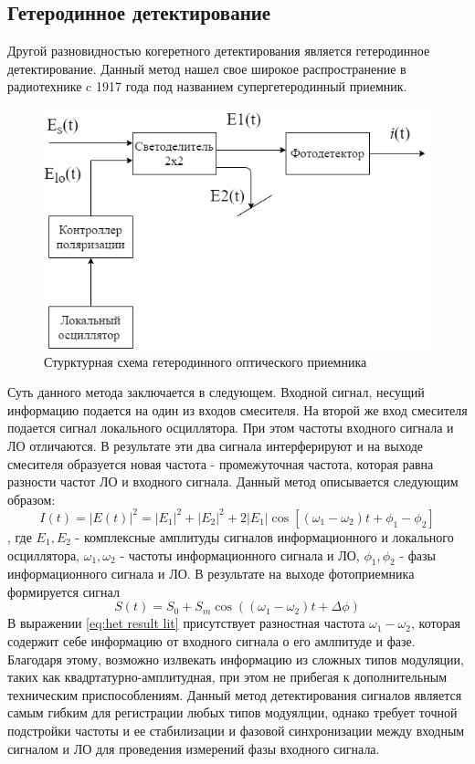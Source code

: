 \subsection{Гетеродинное детектирование}\label{sec:ch1/sect3/heterodyne lit}
Другой разновидностью когеретного детектирования является гетеродинное детектирование. Данный метод нашел свое широкое распространение в радиотехнике c 1917 года под названием супергетеродинный приемник.
\begin{figure}
    \centering
    \includegraphics[width=\textwidth]{images/гетеродин для обзора.png}
    \caption{Стурктурная схема гетеродинного оптического приемника}
    \label{fig:heterodyne scheme lit}
\end{figure}
Суть данного метода заключается в следующем. Входной сигнал, несущий информацию подается на один из входов смесителя. На второй же вход смесителя подается сигнал локального осциллятора. При этом частоты входного сигнала и ЛО отличаются. В результате эти два сигнала интерферируют и на выходе смесителя образуется новая частота - промежуточная частота, которая равна разности частот ЛО и входного сигнала. Данный метод описывается следующим образом:
\begin{equation}
    I(t) =|E(t)|^2 =  |E_1|^2 + |E_2|^2 + 2|E_1|\cos[(\omega_1 - \omega_2)t + \phi_1 - \phi_2]
\end{equation}\label{eq: fiedl heterodyne}, где $E_1, E_2$ - комплексные амплитуды сигналов информационного и локального осциллятора, $\omega_1, \omega_2$ - частоты информационного сигнала и ЛО, $\phi_1, \phi_2$ - фазы информационного сигнала и ЛО. 
В результате на выходе фотоприемника формируется сигнал 
\begin{equation}
    S(t) = S_0 + S_m\cos((\omega_1 - \omega_2)t + \Delta\phi)
\end{equation}\label{eq:het result lit}
В выражении \ref{eq:het result lit} присутствует разностная частота $\omega_1 - \omega_2$, которая содержит себе информацию от входного сигнала о его амлпитуде и фазе. Благодаря этому, возможно излвекать информацию из сложных типов модуляции, таких как квадртатурно-амплитудная, при этом не прибегая к дополнительным техническим приспособлениям. Данный метод детектирования сигналов является самым гибким для регистрации любых типов модуялции, однако требует точной подстройки частоты и ее стабилизации и фазовой синхронизации между входным сигналом и ЛО для проведения измерений фазы входного сигнала. 
